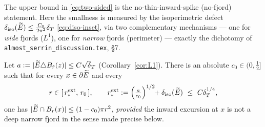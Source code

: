 The upper bound in \eqref{eq:two-sided} is the no-thin-inward-spike
(no-fjord) statement. Here the smallness is measured by the isoperimetric
defect $\delta_{\mathrm{iso}}(\widetilde E)\le \tfrac{C_0}{2\pi^2}\delta_T$ \eqref{eq:diso-inset}, via
two complementary mechanisms --- one for \emph{wide} fjords ($L^1$), one for
\emph{narrow} fjords (perimeter) --- exactly the dichotomy of
\texttt{almost\_serrin\_discussion.tex}, \S7.

\begin{proposition}\label{prop:upper-dens}
Let $a:=|\Etil\triangle B_{\hat r}(z)|\le C\sqrt\dT$
\textup{(}Corollary~\ref{cor:L1}\textup{)}. There is an absolute
$c_0\in(0,\tfrac12]$ such that for every $x\in\partial\widetilde E$ and every
\begin{equation}\label{eq:rstar-ext}
   r\in[\,r_*^{\mathrm{ext}},\,r_0\,],\qquad
   r_*^{\mathrm{ext}}:=\Bigl(\tfrac{a}{c_0}\Bigr)^{1/2}\!\!+\delta_{\mathrm{iso}}(\widetilde E)
   \ \le\ C\delta_T^{1/4},
\end{equation}
one has $|\widetilde E\cap B_r(x)|\le(1-c_0)\pi r^2$, \emph{provided} the inward
excursion at $x$ is not a deep narrow fjord in the sense made precise
below.
\end{proposition}

